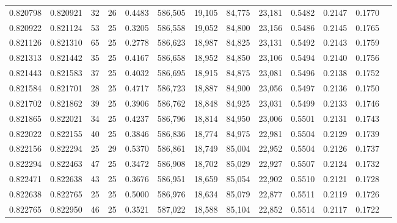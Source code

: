 \begin{tabular}{rrrrrrrrrrrrr}
0.820798 & 0.820921 &    32 &  26 &                                     0.4483 & 586,505 &  19,105 &  84,775 &  23,181 & 0.5482 & 0.2147 & 0.1770 \\
0.820922 & 0.821124 &    53 &  25 &                                     0.3205 & 586,558 &  19,052 &  84,800 &  23,156 & 0.5486 & 0.2145 & 0.1765 \\
0.821126 & 0.821310 &    65 &  25 &                                     0.2778 & 586,623 &  18,987 &  84,825 &  23,131 & 0.5492 & 0.2143 & 0.1759 \\
0.821313 & 0.821442 &    35 &  25 &                                     0.4167 & 586,658 &  18,952 &  84,850 &  23,106 & 0.5494 & 0.2140 & 0.1756 \\
0.821443 & 0.821583 &    37 &  25 &                                     0.4032 & 586,695 &  18,915 &  84,875 &  23,081 & 0.5496 & 0.2138 & 0.1752 \\
0.821584 & 0.821701 &    28 &  25 &                                     0.4717 & 586,723 &  18,887 &  84,900 &  23,056 & 0.5497 & 0.2136 & 0.1750 \\
0.821702 & 0.821862 &    39 &  25 &                                     0.3906 & 586,762 &  18,848 &  84,925 &  23,031 & 0.5499 & 0.2133 & 0.1746 \\
0.821865 & 0.822021 &    34 &  25 &                                     0.4237 & 586,796 &  18,814 &  84,950 &  23,006 & 0.5501 & 0.2131 & 0.1743 \\
0.822022 & 0.822155 &    40 &  25 &                                     0.3846 & 586,836 &  18,774 &  84,975 &  22,981 & 0.5504 & 0.2129 & 0.1739 \\
0.822156 & 0.822294 &    25 &  29 &                                     0.5370 & 586,861 &  18,749 &  85,004 &  22,952 & 0.5504 & 0.2126 & 0.1737 \\
0.822294 & 0.822463 &    47 &  25 &                                     0.3472 & 586,908 &  18,702 &  85,029 &  22,927 & 0.5507 & 0.2124 & 0.1732 \\
0.822471 & 0.822638 &    43 &  25 &                                     0.3676 & 586,951 &  18,659 &  85,054 &  22,902 & 0.5510 & 0.2121 & 0.1728 \\
0.822638 & 0.822765 &    25 &  25 &                                     0.5000 & 586,976 &  18,634 &  85,079 &  22,877 & 0.5511 & 0.2119 & 0.1726 \\
0.822765 & 0.822950 &    46 &  25 &                                     0.3521 & 587,022 &  18,588 &  85,104 &  22,852 & 0.5514 & 0.2117 & 0.1722 \\

\end{tabular}
